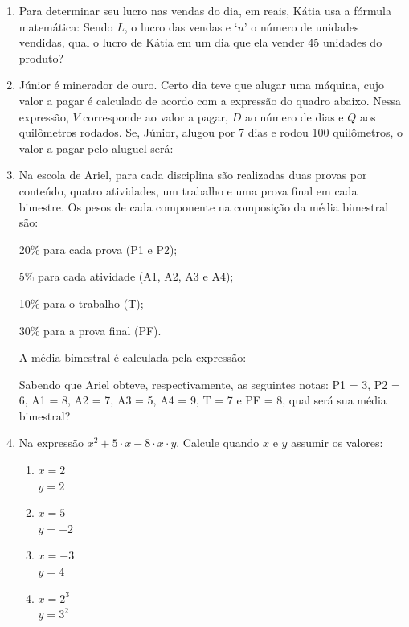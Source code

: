 \documentclass[a4paper]{article}
\begin{document}
	\begin{enumerate}
		\item Para determinar seu lucro nas vendas do dia, em reais, Kátia usa a fórmula matemática:  
		Sendo $L$, o lucro das vendas e $‘u’$ o número de unidades vendidas, qual o lucro de Kátia em um dia que ela vender 45 unidades do produto?
		
		\item Júnior é minerador de ouro. Certo dia teve que alugar uma máquina, cujo valor a pagar é calculado de acordo com a expressão do quadro abaixo. 
		Nessa expressão, $V$ corresponde ao valor a pagar, $D$ ao número de dias e $Q$ aos quilômetros rodados. Se, Júnior, alugou por 7 dias e rodou 100 quilômetros, o valor a pagar pelo aluguel será:
		
		\item
		Na escola de Ariel, para cada disciplina são realizadas duas provas por conteúdo, quatro atividades, um trabalho e uma prova final em cada bimestre. Os pesos de cada componente na composição da média bimestral são:	\vspace*{-3mm}	
		\begin{center}
		20\% para cada prova (P1 e P2);	
			
		5\% para cada atividade (A1, A2, A3 e A4);	
			
		10\% para o trabalho (T);		
		
		30\% para a prova final (PF).
		\end{center} \vspace*{-5mm}		
		A média bimestral é calculada pela expressão: \\
			
		Sabendo que Ariel obteve, respectivamente, as seguintes notas:
		P1 = 3, P2 = 6, A1 = 8, A2 = 7, A3 = 5, A4 = 9, T = 7 e PF = 8, qual será sua média bimestral?
		
		\item  Na expressão $x^2 + 5\cdot x - 8\cdot x \cdot y$. Calcule quando $x$ e $y$ assumir os valores: 
		\vspace{-5mm}
		\begin{multicols}{4}
			\begin{enumerate}[]
				\item $x = 2 $ \\ $y = 2 $
				\item $x = 5 $ \\ $ y = -2 $
				\item $x = -3$ \\ $ y = 4 $
				\item $x = 2^3$ \\ $ y = 3^2 $
			\end{enumerate}
		\end{multicols}
		

\end{enumerate}
\end{document}
